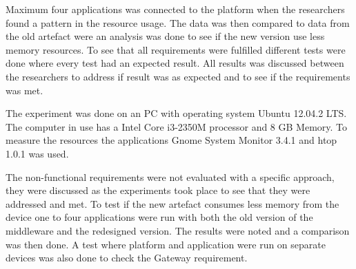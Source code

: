 Maximum four applications was connected to the platform when the researchers found a pattern in the resource usage. The data was then compared to data from the old artefact were an analysis was done to see if the new version use less memory resources. To see that all requirements were fulfilled different tests were done where every test had an expected result. All results was discussed between the researchers to address if result was as expected and to see if the requirements was met. 

The experiment was done on an PC with operating system Ubuntu 12.04.2 LTS. The computer in use has a Intel Core i3-2350M processor and 8 GB Memory. To measure the resources the applications Gnome System Monitor 3.4.1 \cite{gnomesm} and htop 1.0.1 \cite{htop} was used. 

The non-functional requirements were not evaluated with a specific approach, they were discussed as the experiments took place to see that they were addressed and met. To test if the new artefact consumes less memory from the device one to four applications were run with both the old version of the middleware and the redesigned version. The results were noted and a comparison was then done. A test where platform and application were run on separate devices was also done to check the Gateway requirement.
